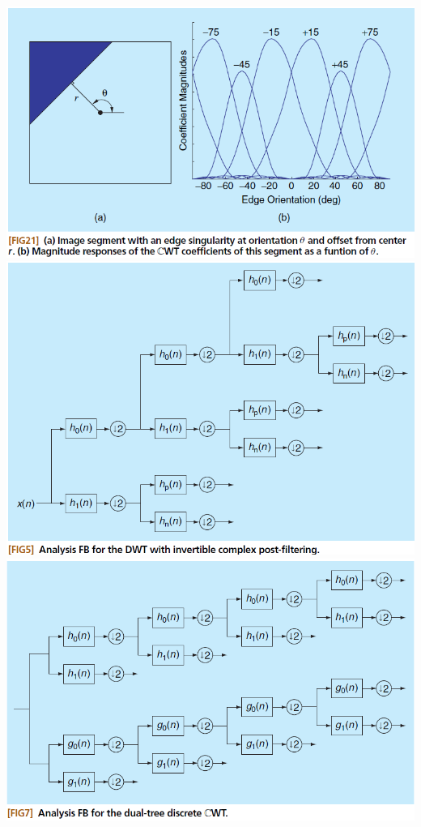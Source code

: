 \documentclass[11pt]{article} %
\begin{document}
\includegraphics[width=\textwidth]{dt_edge}
\includegraphics[width=\textwidth]{DWT_fb}
\includegraphics[width=\textwidth]{dt_analysis_fb}
\end{document}
